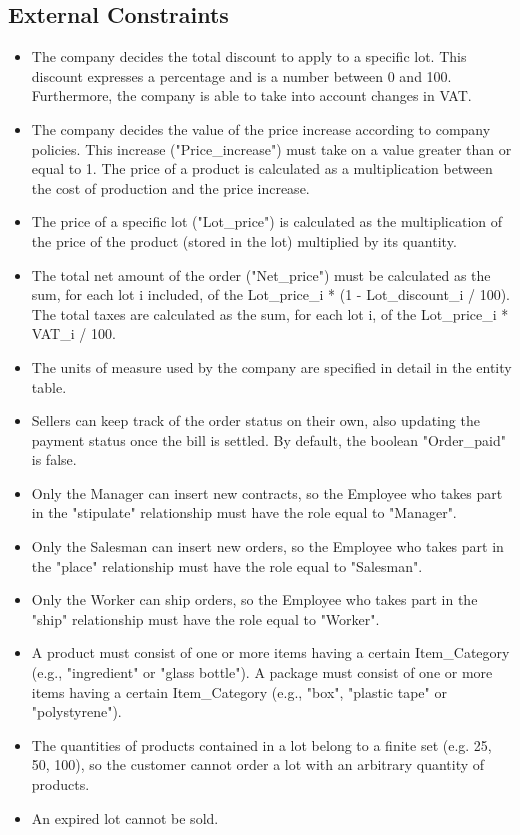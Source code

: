 \subsection{External Constraints}
\begin{itemize}
\item The company decides the total discount to apply to a specific lot. This discount expresses a percentage and is a number between 0 and 100. Furthermore, the company is able to take into account changes in VAT.
\item The company decides the value of the price increase according to company policies. This increase ("Price\_increase") must take on a value greater than or equal to 1. The price of a product is calculated as a multiplication between the cost of production and the price increase.
\item The price of a specific lot ("Lot\_price") is calculated as the multiplication of the price of the product (stored in the lot) multiplied by its quantity.
\item The total net amount of the order ("Net\_price") must be calculated as the sum, for each lot i included, of the Lot\_price\_i * (1 - Lot\_discount\_i / 100). The total taxes are calculated as the sum, for each lot i, of the Lot\_price\_i * VAT\_i / 100.
\item The units of measure used by the company are specified in detail in the entity table.
\item Sellers can keep track of the order status on their own, also updating the payment status once the bill is settled. By default, the boolean "Order\_paid" is false. 
\item Only the Manager can insert new contracts, so the Employee who takes part in the "stipulate" relationship must have the role equal to "Manager". 
\item Only the Salesman can insert new orders, so the Employee who takes part in the "place" relationship must have the role equal to "Salesman". 
\item Only the Worker can ship orders, so the Employee who takes part in the "ship" relationship must have the role equal to "Worker".
\item A product must consist of one or more items having a certain Item\_Category (e.g., "ingredient" or "glass bottle"). A package must consist of one or more items having a certain Item\_Category (e.g., "box", "plastic tape" or "polystyrene"). 
\item The quantities of products contained in a lot belong to a finite set (e.g. 25, 50, 100), so the customer cannot order a lot with an arbitrary quantity of products.
\item An expired lot cannot be sold.
\end{itemize}
